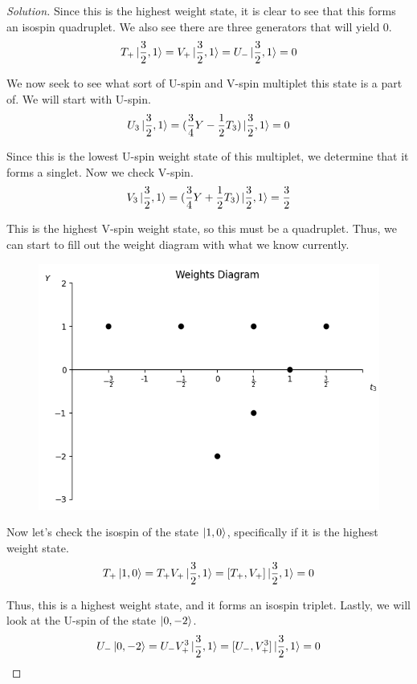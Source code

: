 \documentclass[12pt]{article}
\newenvironment{solution}{\begin{proof}[Solution]}{\end{proof}}
\begin{document}
\begin{solution}

Since this is the highest weight state, it is clear to see that this forms an isospin quadruplet. We also see there are three generators that will yield 0.
\begin{equation*}
    T_+\ket{\frac{3}{2},1}=V_+\ket{\frac{3}{2},1}=U_-\ket{\frac{3}{2},1}=0 
\end{equation*}

We now seek to see what sort of U-spin and V-spin multiplet this state is a part of. We will start with U-spin.
\begin{equation*}
    U_3\ket{\frac{3}{2},1}=(\frac{3}{4}Y-\frac{1}{2}T_3)\ket{\frac{3}{2},1}=0
\end{equation*}

Since this is the lowest U-spin weight state of this multiplet, we determine that it forms a singlet. Now we check V-spin.
\begin{equation*}
    V_3\ket{\frac{3}{2},1}=(\frac{3}{4}Y+\frac{1}{2}T_3)\ket{\frac{3}{2},1}=\frac{3}{2}
\end{equation*}

This is the highest V-spin weight state, so this must be a quadruplet. Thus, we can start to fill out the weight diagram with what we know currently.

\begin{figure}[h!]
    \centering
    \includegraphics[width=0.5\linewidth]{weights_diagram1.png}
\end{figure}

Now let's check the isospin of the state $\ket{1,0}$, specifically if it is the highest weight state.
\begin{equation*}
    T_+\ket{1,0}=T_+V_+\ket{\frac{3}{2},1}=[T_+,V_+]\ket{\frac{3}{2},1}=0
\end{equation*}

Thus, this is a highest weight state, and it forms an isospin triplet. Lastly, we will look at the U-spin of the state $\ket{0,-2}$.
\begin{equation*}
    U_-\ket{0,-2}=U_-V_+^3\ket{\frac{3}{2},1}=[U_-,V_+^3]\ket{\frac{3}{2},1}=0
\end{equation*}


\end{solution}
\end{document}
